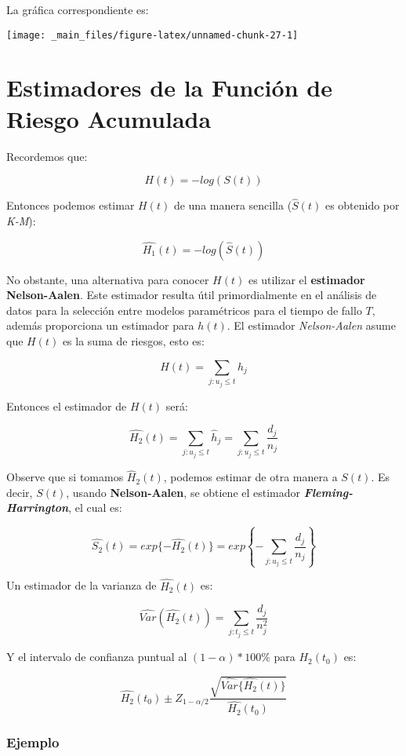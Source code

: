 \documentclass[
  a4paper,
  oneside,
  openany]{book}
\begin{document}
La gráfica correspondiente es:

\begin{center}\texttt{[image: \_main\_files/figure-latex/unnamed-chunk-27-1]} \end{center}

\hypertarget{estimadores-de-la-funciuxf3n-de-riesgo-acumulada}{%
\section{Estimadores de la Función de Riesgo Acumulada}\label{estimadores-de-la-funciuxf3n-de-riesgo-acumulada}}

Recordemos que:

\[
H(t)=-log(S(t)) 
\]

Entonces podemos estimar \(H(t)\) de una manera sencilla (\(\hat{S}(t)\) es obtenido por \emph{K-M}):

\[
\hat{H_1}(t) = -log(\hat{S}(t))
\]

No obstante, una alternativa para conocer \(H(t)\) es utilizar el \textbf{estimador Nelson-Aalen}. Este estimador resulta útil primordialmente en el análisis de datos para la selección entre modelos paramétricos para el tiempo de fallo \(T\), además proporciona un estimador para \(h(t)\). El estimador \emph{Nelson-Aalen} asume que \(H(t)\) es la suma de riesgos, esto es:

\[
H(t)=\sum_{j:u_{j}\leq t} h_j
\]

Entonces el estimador de \(H(t)\) será:

\[
\hat{H_2}(t)=\sum_{j:u_{j}\leq t} \hat h_j=\sum_{j:u_{j}\leq t}\frac{d_j}{n_j}
\]

Observe que si tomamos \(\hat H_2(t)\), podemos estimar de otra manera a \(S(t)\). Es decir, \(S(t)\), usando \textbf{Nelson-Aalen}, se obtiene el estimador \emph{\textbf{Fleming-Harrington}}, el cual es:

\[
\hat{S_2}(t) = exp\{-\hat{H_2}(t)\} = exp\left\{-\sum_{j:u_{j}\leq t}\frac{d_j}{n_j}\right\}
\]

Un estimador de la varianza de \(\hat{H_2}(t)\) es:

\[
\hat{Var}(\hat{H_2}(t)) = \sum_{j:t_{j}\leq t}\frac{d_j}{n_{j}^{2}}
\]

Y el intervalo de confianza puntual al \((1-\alpha)*100\%\) para \({H_2}(t_0)\) es:

\[
\hat{H_2}(t_{0}) \pm Z_{1-\alpha/2} \frac{\sqrt{\hat{Var}\{\hat{H_2}(t)\}}}{\hat{H_2}(t_{0})}
\]

\hypertarget{ejemplo-11}{%
\subsubsection*{Ejemplo}\label{ejemplo-11}}
\end{document}
